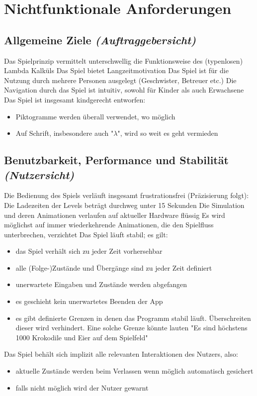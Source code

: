 \section{Nichtfunktionale Anforderungen}

\subsection{Allgemeine Ziele \textit{(Auftraggebersicht)}}
\begin{requirements}
	 Das Spielprinzip vermittelt unterschwellig die Funktionsweise des (typenlosen) Lambda Kalküls
	 Das Spiel bietet Langzeitmotivation
	 Das Spiel ist für die Nutzung durch mehrere Personen ausgelegt (Geschwister, Betreuer etc.)
	 Die Navigation durch das Spiel ist intuitiv, sowohl für Kinder als auch Erwachsene
	 Das Spiel ist insgesamt kindgerecht entworfen:
		\begin{itemize}
			\item Piktogramme werden überall verwendet, wo möglich
			\item Auf Schrift, insbesondere auch "$\lambda$", wird so weit es geht vermieden
		\end{itemize}
\end{requirements}

\subsection{Benutzbarkeit, Performance und Stabilität \textit{(Nutzersicht)}}
\begin{requirements}
	 Die Bedienung des Spiels verläuft insgesamt frustrationsfrei (Präzisierung folgt):
	 Die Ladezeiten der Levels beträgt durchweg unter 15 Sekunden
	 Die Simulation und deren Animationen verlaufen auf aktueller Hardware flüssig
	 Es wird möglichst auf immer wiederkehrende Animationen, die den Spielfluss unterbrechen, verzichtet
	 Das Spiel läuft stabil; es gilt:
		\begin{itemize}
			\item das Spiel verhält sich zu jeder Zeit vorhersehbar
			\item alle (Folge-)Zustände und Übergänge sind zu jeder Zeit definiert
			\item unerwartete Eingaben und Zustände werden abgefangen
			\item es geschieht kein unerwartetes Beenden der App
			\item es gibt definierte Grenzen in denen das Programm stabil läuft. Überschreiten dieser wird verhindert. Eine solche Grenze könnte lauten "Es sind höchstens 1000 Krokodile und Eier auf dem Spielfeld"
		\end{itemize}
	 Das Spiel behält sich implizit alle relevanten Interaktionen des Nutzers, also:
		\begin{itemize}
			\item aktuelle Zustände werden beim Verlassen wenn möglich automatisch gesichert
			\item falls nicht möglich wird der Nutzer gewarnt
		\end{itemize}
\end{requirements}

